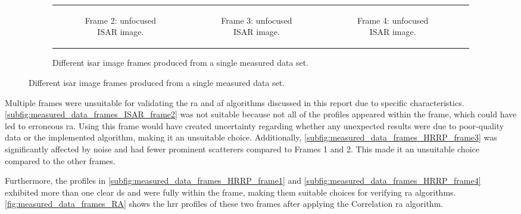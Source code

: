 \documentclass[class=report,11pt,crop=false]{standalone}
\begin{document}
\begin{figure}[H]
\begin{minipage}{0.9\linewidth}
\begin{figure}
\begin{tabular}{@{}cccc@{}}
                    \begin{subfigure}{0.25\linewidth}
                        \centering
                        \resizebox{\linewidth}{!}{}
                        \caption{Frame 2: unfocused ISAR image.\label{subfig:measured_data_frames_ISAR_frame2}}
                    \end{subfigure}
                    &
                    \begin{subfigure}{0.25\linewidth}
                        \centering
                        \resizebox{\linewidth}{!}{}
                         \caption{Frame 3: unfocused ISAR image.\label{subfig:measured_data_frames_ISAR_frame3}}
                    \end{subfigure}
                    &
                    \begin{subfigure}{0.25\linewidth}
                        \centering
                        \resizebox{\linewidth}{!}{}
                         \caption{Frame 4: unfocused ISAR image.\label{subfig:measured_data_frames_ISAR_frame4}}
                    \end{subfigure}
                \end{tabular}
                \caption{Different \gls{isar} image frames produced from a single measured data set. \label{fig:measured_data_frames}}
            \end{figure}
        \end{minipage}
    \end{figure}

    Multiple frames were unsuitable for validating the \gls{ra} and \gls{af} algorithms discussed in this report due to specific characteristics. \autoref{subfig:measured_data_frames_ISAR_frame2} was not suitable because not all of the profiles appeared within the frame, which could have led to erroneous \gls{ra}. Using this frame would have created uncertainty regarding whether any unexpected results were due to poor-quality data or the implemented algorithm, making it an unsuitable choice. Additionally, \autoref{subfig:measured_data_frames_HRRP_frame3} was significantly affected by noise and had fewer prominent scatterers compared to Frames 1 and 2. This made it an unsuitable choice compared to the other frames.

    Furthermore, the profiles in \autoref{subfig:measured_data_frames_HRRP_frame1} and \autoref{subfig:measured_data_frames_HRRP_frame4} exhibited more than one clear \gls{ds} and were fully within the frame, making them suitable choices for verifying \gls{ra} algorithms. \autoref{fig:measured_data_frames_RA} shows the \gls{hrr} profiles of these two frames after applying the Correlation \gls{ra} algorithm.
    
\end{document}
